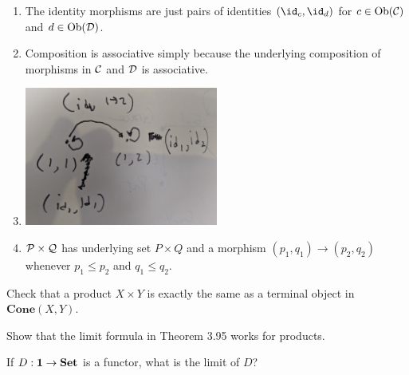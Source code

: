 \solution
\begin{enumerate}
	\item The identity morphisms are just pairs of identities $(\id_c,\id_d)$ for $c\in\textrm{Ob}(\mathcal{C})$ and $d\in\textrm{Ob}(\mathcal{D})$.
	\item Composition is associative simply because the underlying composition of morphisms in $\mathcal{C}$ and $\mathcal{D}$ is associative.
	\item \includegraphics[width=0.5\textwidth]{images/3-90.jpg}
	\item $\mathcal{P}\times\mathcal{Q}$ has underlying set $P\times Q$ and a morphism $(p_1,q_1)\to(p_2,q_2)$ whenever $p_1\leq p_2$ and $q_1\leq q_2$.
\end{enumerate}

Check that a product $X\times Y$ is exactly the same as a terminal object in $\textbf{Cone}(X,Y)$.


Show that the limit formula in Theorem 3.95 works for products.


If $D:\textbf{1}\to\textbf{Set}$ is a functor, what is the limit of $D$?





